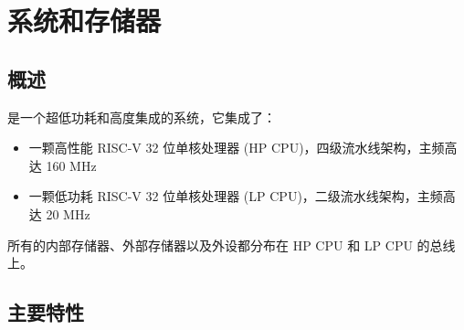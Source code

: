 \documentclass[main\_\_CN.tex]{subfiles}
\begin{document}

\ifglobal
\else
    {\let\clearpage\relax \listoftodos}
    {\let\clearpage\relax \listofdonetodos}
    \tableofcontents
\fi



\hypertarget{sysmem}{}
\chapter{系统和存储器}
\label{mod:sysmem}

\section{概述}

\chipname{} 是一个超低功耗和高度集成的系统，它集成了：
\begin{itemize}
    \item 一颗高性能 RISC-V 32 位单核处理器 (HP CPU)，四级流水线架构，主频高达 160 MHz
    \item 一颗低功耗 RISC-V 32 位单核处理器 (LP CPU)，二级流水线架构，主频高达 20 MHz
\end{itemize}
所有的内部存储器、外部存储器以及外设都分布在 HP CPU 和 LP CPU 的总线上。


\section{主要特性}
\end{document}
